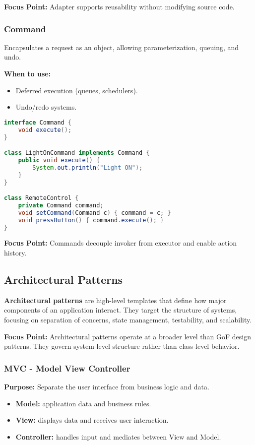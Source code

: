 \documentclass[a4paper,12pt]{article}
\begin{document}
\textbf{Focus Point:} Adapter supports reusability without modifying source code.

\subsubsection{Command}

Encapsulates a request as an object, allowing parameterization, queuing, and undo.

\textbf{When to use:}
\begin{itemize}
  \item Deferred execution (queues, schedulers).
  \item Undo/redo systems.
\end{itemize}

\begin{lstlisting}[language=Java]
interface Command {
    void execute();
}

class LightOnCommand implements Command {
    public void execute() {
        System.out.println("Light ON");
    }
}

class RemoteControl {
    private Command command;
    void setCommand(Command c) { command = c; }
    void pressButton() { command.execute(); }
}
\end{lstlisting}

\textbf{Focus Point:} Commands decouple invoker from executor and enable action history.


\subsection{Architectural Patterns}

\textbf{Architectural patterns} are high-level templates that define how major components of an application interact. They target the structure of systems, focusing on separation of concerns, state management, testability, and scalability.

\textbf{Focus Point:} Architectural patterns operate at a broader level than GoF design patterns. They govern system-level structure rather than class-level behavior.

\subsubsection{MVC - Model View Controller}

\textbf{Purpose:} Separate the user interface from business logic and data.

\begin{itemize}
  \item \textbf{Model:} application data and business rules.
  \item \textbf{View:} displays data and receives user interaction.
  \item \textbf{Controller:} handles input and mediates between View and Model.
\end{itemize}
\end{document}
